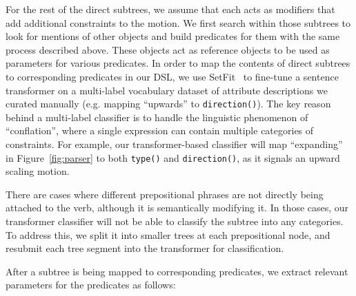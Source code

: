 For the rest of the direct subtrees, we assume that each acts as modifiers that add additional constraints to the motion.
We first search within those subtrees to look for mentions of other objects and build predicates for them with the same process described above.
These objects act as reference objects to be used as parameters for various predicates.
In order to map the contents of direct subtrees to corresponding predicates in our DSL, we use SetFit~\cite{tunstall2022setfit} to fine-tune a sentence transformer on a multi-label vocabulary dataset of attribute descriptions we curated manually (e.g. mapping ``upwards'' to \texttt{direction()}).
The key reason behind a multi-label classifier is to handle the linguistic phenomenon of ``conflation'', where a single expression can contain multiple categories of constraints.
For example, our transformer-based classifier will map ``expanding'' in Figure~\ref{fig:parser} to both \texttt{type()} and \texttt{direction()}, as it signals an upward scaling motion.

There are cases where different prepositional phrases are not directly being attached to the verb, although it is semantically modifying it.
In those cases, our transformer classifier will not be able to classify the subtree into any categories. 
To address this, we split it into smaller trees at each prepositional node, and resubmit each tree segment into the transformer for classification.

After a subtree is being mapped to corresponding predicates, we extract relevant parameters for the predicates as follows:


